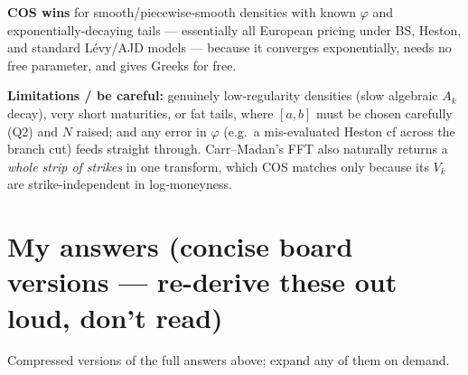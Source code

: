 \documentclass[
  11pt,
]{article}
\begin{document}
\begin{enumerate}
  \textbf{COS wins} for smooth/piecewise-smooth densities with known
  \(φ\) and exponentially-decaying tails --- essentially all European
  pricing under BS, Heston, and standard Lévy/AJD models --- because it
  converges exponentially, needs no free parameter, and gives Greeks for
  free.

  \textbf{Limitations / be careful:} genuinely low-regularity densities
  (slow algebraic \(A_k\) decay), very short maturities, or fat tails,
  where \([a,b]\) must be chosen carefully (Q2) and \(N\) raised; and
  any error in \(φ\) (e.g.~a mis-evaluated Heston cf across the branch
  cut) feeds straight through. Carr--Madan's FFT also naturally returns
  a \emph{whole strip of strikes} in one transform, which COS matches
  only because its \({V_k}\) are strike-independent in log-moneyness.
\end{enumerate}

\hypertarget{my-answers-concise-board-versions-re-derive-these-out-loud-dont-read}{%
\section{My answers (concise board versions --- re-derive these out
loud, don't
read)}\label{my-answers-concise-board-versions-re-derive-these-out-loud-dont-read}}

Compressed versions of the full answers above; expand any of them on
demand.
\end{document}
